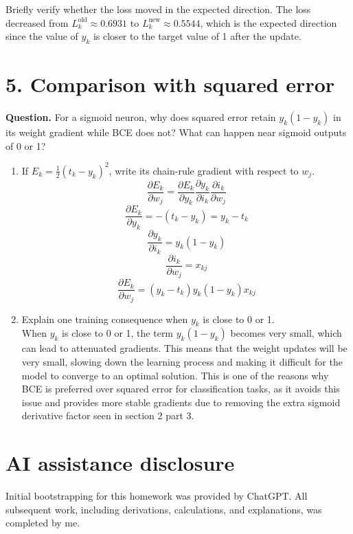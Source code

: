 \documentclass[11pt]{article}
\begin{document}
Briefly verify whether the loss moved in the expected direction.
The loss decreased from $L_k^{\text{old}}\approx 0.6931$ to $L_k^{\text{new}}\approx 0.5544$, 
which is the expected direction since the value of $y_k$ is closer to the target 
value of 1 after the update.

\section*{5. Comparison with squared error}

\textbf{Question.} For a sigmoid neuron, why does squared error retain $y_k(1-y_k)$ in its weight gradient while BCE does not? What can happen near sigmoid outputs of 0 or 1?

\begin{enumerate}[label=\arabic*.]
    \item If $E_k=\tfrac12(t_k-y_k)^2$, write its chain-rule gradient with respect to $w_j$.
    \[
    \frac{\partial E_k}{\partial w_j}= \frac{\partial E_k}{\partial y_k}
      \frac{\partial y_k}{\partial i_k}
      \frac{\partial i_k}{\partial w_j}
    \]
    \[
    \frac{\partial E_k}{\partial y_k} = -(t_k-y_k) = y_k-t_k
    \]
    \[
    \frac{\partial y_k}{\partial i_k} = y_k(1-y_k)
    \]
    \[
    \frac{\partial i_k}{\partial w_j} = x_{kj}
    \]
    \[
    \frac{\partial E_k}{\partial w_j} = (y_k-t_k)y_k(1-y_k)x_{kj}
    \]
    \item Explain one training consequence when $y_k$ is close to 0 or 1. \\
    When $y_k$ is close to 0 or 1, the term $y_k(1-y_k)$ becomes very small, 
    which can lead to attenuated gradients. This means that the weight updates
    will be very small, slowing down the learning process and making it 
    difficult for the model to converge to an optimal solution.
    This is one of the reasons why BCE is preferred over squared error 
    for classification tasks, as it avoids this issue and provides more stable 
    gradients due to removing the extra sigmoid derivative factor seen in section 
    2 part 3.

\end{enumerate}

\section*{AI assistance disclosure}

Initial bootstrapping for this homework was provided by ChatGPT. 
All subsequent work, including derivations, calculations, and explanations, 
was completed by me.
\end{document}
